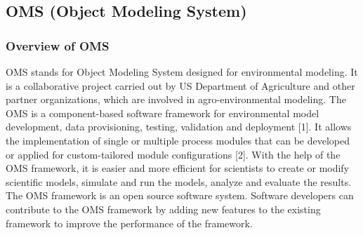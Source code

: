 \subsection{OMS (Object Modeling System)}
\par
\subsubsection{Overview of OMS}
\par
OMS stands for Object Modeling System designed for environmental modeling. It is a collaborative project carried out by US Department of Agriculture and other partner organizations, which are involved in agro-environmental modeling. The OMS is a component-based software framework for environmental model development, data provisioning, testing, validation and deployment [1]. It allows the implementation of single or multiple process modules that can be developed or applied for custom-tailored module configurations [2]. With the help of the OMS framework, it is easier and more efficient for scientists to create or modify scientific models, simulate and run the models, analyze and evaluate the results. The OMS framework is an open source software system. Software developers can contribute to the OMS framework by adding new features to the existing framework to improve the performance of the framework.
\par
